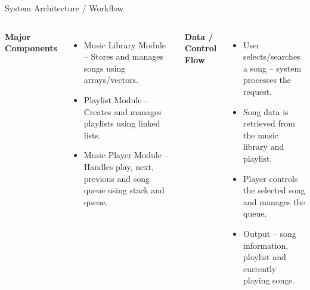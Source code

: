 \documentclass[aspectratio=169,11pt]{beamer}
\begin{document}
\begin{frame}{System Architecture / Workflow}

\begin{center}
\end{center}

\vspace{1.0mm}

{\footnotesize
\begin{columns}[T,totalwidth=\textwidth]

\textbf{\color{GEUBlue}Major Components}
\begin{itemize}\itemsep1.5pt\parskip0pt
\item Music Library Module -- Stores and manages songs using arrays/vectors.
\item Playlist Module -- Creates and manages playlists using linked lists.
\item Music Player Module -- Handles play, next, previous and song queue using stack and queue.
\end{itemize}

\textbf{\color{GEUBlue}Data / Control Flow}
\begin{itemize}\itemsep1.5pt\parskip0pt
\item User selects/searches a song -- system processes the request.
\item Song data is retrieved from the music library and playlist.
\item Player controls the selected song and manages the queue.
\item Output -- song information, playlist and currently playing songs.
\end{itemize}

\end{columns}}
\end{frame}
\end{document}
